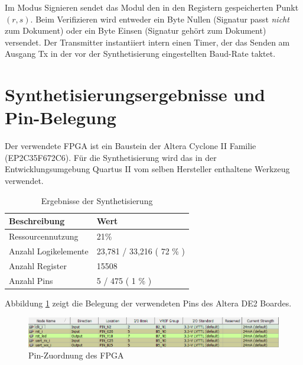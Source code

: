Im Modus Signieren sendet das Modul den in den Registern gespeicherten Punkt $(r, s)$. Beim Verifizieren wird entweder ein Byte Nullen (Signatur passt \textit{nicht} zum Dokument) oder ein Byte Einsen (Signatur gehört zum Dokument) versendet. Der Transmitter instantiiert intern einen Timer, der das Senden am Ausgang Tx in der vor der Synthetisierung eingestellten Baud-Rate taktet. \\



\section{Synthetisierungsergebnisse und Pin-Belegung}

Der verwendete FPGA ist ein Baustein der Altera Cyclone II Familie (EP2C35F672C6). Für die Synthetisierung wird das in der Entwicklungsumgebung Quartus II vom selben Hersteller enthaltene Werkzeug verwendet. \\

\begin{table} [h]
	\centering 
	\begin{tabular}{ | p{6cm} | p{3cm} | }
		\hline
		\textbf{Beschreibung} & \textbf{Wert}\\
		\hline
		Ressourcennutzung & 21\% \\
		\hline
		Anzahl Logikelemente & 23,781 / 33,216 ( 72 \% ) \\
		\hline
		Anzahl Register & 15508 \\
		\hline
		Anzahl Pins & 5 / 475 ( 1 \% ) \\
		\hline
	\end{tabular}
	\caption{Ergebnisse der Synthetisierung}
	\label{tab:vhdl-impl-de2}
\end{table}

Abbildung \ref{fig:pins} zeigt die Belegung der verwendeten Pins des Altera DE2 Boardes.

\begin{figure}[H]
	\centering
	\includegraphics[width=\textwidth]{bilder/pins}
	\caption{Pin-Zuordnung des FPGA}
	\label{fig:pins}
\end{figure}
